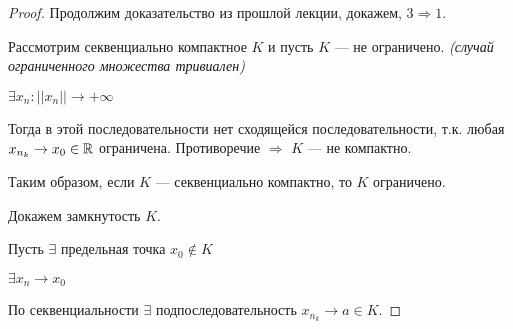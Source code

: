 

\cfoot{}


\begin{proof}
    Продолжим доказательство из прошлой лекции, докажем, $3\Rightarrow1$.

    Рассмотрим секвенциально компактное $K$ и пусть $K$ --- не ограничено. \textit{(случай ограниченного множества тривиален)}

    $\exists x_n : ||x_n||\to+\infty$

    Тогда в этой последовательности нет сходящейся последовательности, т.к. любая $x_{n_k}\to x_0\in\operatorname*{\mathbb{R}}$ ограничена. Противоречие $\Rightarrow$ $K$ --- не компактно.

    Таким образом, если $K$ --- секвенциально компактно, то $K$ ограничено.

    Докажем замкнутость $K$.

    Пусть $\exists$ предельная точка $x_0\not\in K$

    $\exists x_n\to x_0$

    По секвенциальности $\exists$ подпоследовательность $x_{n_k}\to a\in K$.
\end{proof}

